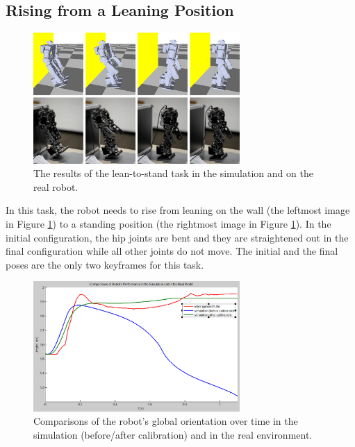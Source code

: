 \subsection{Rising from a Leaning Position}

\begin{figure}[!t]
  \centering
  \includegraphics[width=0.7\textwidth]{figures/lean2Stand}
  \caption{The results of the lean-to-stand task in the simulation and on the real robot.}
  \label{fig:lean2Stand}
\end{figure}

In this task, the robot needs to rise from leaning on the wall (the leftmost image in Figure \ref{fig:lean2Stand}) to a standing position (the rightmost image in Figure \ref{fig:lean2Stand}). In the initial configuration, the hip joints are bent and they are straightened out in the final configuration while all other joints do not move. The initial and the final poses are the only two keyframes for this task.

\begin{figure}[!t]
  \centering
  \includegraphics[width=0.7\textwidth]{figures/simRobotCompare}
  \caption{Comparisons of the robot's global orientation over time in the simulation (before/after calibration) and in the real environment.}
  \label{fig:simRobotCompare}
\end{figure}


